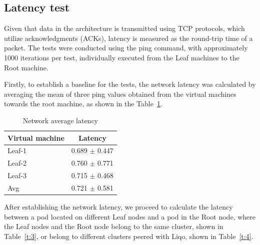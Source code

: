 \subsection{Latency test}
Given that data in the architecture is transmitted using TCP protocols, which utilize acknowledgments (ACKs), latency is measured as the round-trip time of a packet. The tests were conducted using the ping command, with approximately 1000 iterations per test, individually executed from the Leaf machines to the Root machine.

Firstly, to establish a baseline for the tests, the network latency was calculated by averaging the mean of three ping values obtained from the virtual machines towards the root machine, as shown in the Table~\ref{t:2}.

\begin{table}[ht]              
\centering 
\begin{tabular}{|l|c|}
\hline
\textbf{Virtual machine} & \textbf{Latency}  \\ 
\hline
Leaf-1 & 0.689 $\pm$ 0.447  \\
\hline
Leaf-2 & 0.760 $\pm$ 0.771 \\
\hline
Leaf-3 & 0.715 $\pm$ 0.468 \\
\hline
Avg & 0.721 $\pm$ 0.581 \\
\hline
\end{tabular}
\caption[Network average latency ]{Network average latency} \label{t:2}  
\end{table}

After establishing the network latency, we proceed to calculate the latency between a pod located on different Leaf nodes and a pod in the Root node, where the Leaf nodes and the Root node belong to the same cluster, shown in Table~\ref{t:3}, or belong to different clusters peered with Liqo, shown in Table~\ref{t:4}.

